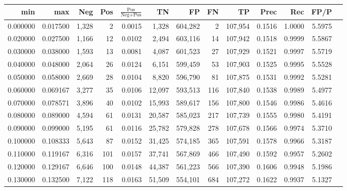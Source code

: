 \begin{tabular}{rrrrrrrrrrrrr}
\toprule
     min &      max &    Neg &   Pos & $\frac{\text{Pos}}{\text{Neg}+\text{Pos}}$ &      TN &      FP &      FN &      TP &   Prec &    Rec &   FP/P \\
\midrule
0.000000 & 0.017500 &  1,328 &     2 &                                     0.0015 &   1,328 & 604,282 &       2 & 107,954 & 0.1516 & 1.0000 & 5.5975 \\
0.020000 & 0.027500 &  1,166 &    12 &                                     0.0102 &   2,494 & 603,116 &      14 & 107,942 & 0.1518 & 0.9999 & 5.5867 \\
0.030000 & 0.038000 &  1,593 &    13 &                                     0.0081 &   4,087 & 601,523 &      27 & 107,929 & 0.1521 & 0.9997 & 5.5719 \\
0.040000 & 0.048000 &  2,064 &    26 &                                     0.0124 &   6,151 & 599,459 &      53 & 107,903 & 0.1525 & 0.9995 & 5.5528 \\
0.050000 & 0.058000 &  2,669 &    28 &                                     0.0104 &   8,820 & 596,790 &      81 & 107,875 & 0.1531 & 0.9992 & 5.5281 \\
0.060000 & 0.069167 &  3,277 &    35 &                                     0.0106 &  12,097 & 593,513 &     116 & 107,840 & 0.1538 & 0.9989 & 5.4977 \\
0.070000 & 0.078571 &  3,896 &    40 &                                     0.0102 &  15,993 & 589,617 &     156 & 107,800 & 0.1546 & 0.9986 & 5.4616 \\
0.080000 & 0.089000 &  4,594 &    61 &                                     0.0131 &  20,587 & 585,023 &     217 & 107,739 & 0.1555 & 0.9980 & 5.4191 \\
0.090000 & 0.099000 &  5,195 &    61 &                                     0.0116 &  25,782 & 579,828 &     278 & 107,678 & 0.1566 & 0.9974 & 5.3710 \\
0.100000 & 0.108333 &  5,643 &    87 &                                     0.0152 &  31,425 & 574,185 &     365 & 107,591 & 0.1578 & 0.9966 & 5.3187 \\
0.110000 & 0.119167 &  6,316 &   101 &                                     0.0157 &  37,741 & 567,869 &     466 & 107,490 & 0.1592 & 0.9957 & 5.2602 \\
0.120000 & 0.129167 &  6,646 &   100 &                                     0.0148 &  44,387 & 561,223 &     566 & 107,390 & 0.1606 & 0.9948 & 5.1986 \\
0.130000 & 0.132500 &  7,122 &   118 &                                     0.0163 &  51,509 & 554,101 &     684 & 107,272 & 0.1622 & 0.9937 & 5.1327 \\

\end{tabular}
